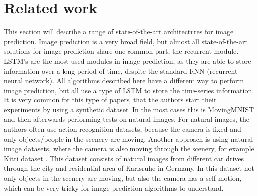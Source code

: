 \section{Related work} \label{section::related}
 This section will describe a range of state-of-the-art architectures for image prediction. Image prediction is a very broad field, but almost all state-of-the-art solutions
 for image prediction share one common part, the recurrent module. LSTM's are the most used modules in image prediction, as they are able to store information over a long period of time, despite
 the standard RNN (recurrent neural network). All algorithms described here have a different way to perform image prediction, but all use a type of LSTM to store the time-series information.
 It is very common for this type of papers, that the authors start their experiments by using a synthetic dataset. In the most cases this is MovingMNIST \cite{LeCun1998} and then afterwards performing
 tests on natural images. For natural images, the authors often use action-recognition datasets, because the camera is fixed and only objects/people in the scenery are moving. Another approach
 is using natural image datasets, where the camera is also moving through the scenery, for example Kitti dataset \cite{Geiger2013}. This dataset consists of natural images from different car
 drives through the city and residential area of Karlsruhe in Germany.
 In this dataset not only objects in the scenery are moving, but also the camera has a self-motion, which can be very tricky for image prediction algorithms to \glqq understand\grqq.
 
